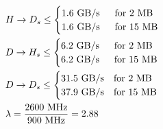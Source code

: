 \documentclass{standalone}
\begin{document}
\begin{equation*}
\begin{aligned}
&H \rightarrow D_s \leq
	\begin{cases}
    		1.6 \text{ GB/s} & \text{\: for 2 MB} \\
	   	1.6 \text{ GB/s} & \text{\: for 15 MB}
  	\end{cases} \\
&D \rightarrow H_s \leq
	\begin{cases}
    		6.2 \text{ GB/s} & \text{\: for 2 MB} \\
	   	6.2 \text{ GB/s} & \text{\: for 15 MB}
  	\end{cases} \\
&D \rightarrow D_s \leq
	\begin{cases}
    		31.5 \text{ GB/s} & \text{for 2 MB} \\
	   	37.9 \text{ GB/s} & \text{for 15 MB}
  	\end{cases} \\
&\lambda = \frac{2600 \text{ MHz}}{900 \text{ MHz}} = 2.88
\end{aligned}
\end{equation*}
\end{document}
